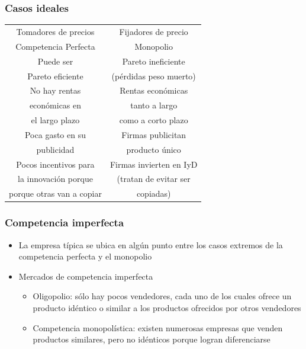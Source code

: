 \documentclass{beamer}
\begin{document}
\begin{frame}
\frametitle{Casos ideales}
\small
\begin{center}
    \begin{tabular}{c|c}
    \hline
    \hline
    Tomadores de precios & Fijadores de precio \\
    Competencia Perfecta & Monopolio
    \\
    \hline
    \hline
    Puede ser   & Pareto ineficiente \\ 
    Pareto eficiente & (pérdidas peso muerto)
    \\
    \hline
    No hay rentas & Rentas económicas \\
    económicas en & tanto a largo \\
    el largo plazo & como a corto plazo
    \\
    \hline
    Poca gasto en su & Firmas publicitan \\ publicidad & producto único 
    \\
    \hline
    Pocos incentivos para & Firmas invierten en IyD \\ 
    la innovación porque & (tratan de evitar ser \\
    porque otras van a copiar & copiadas)
\end{tabular}
\end{center}
\end{frame}

\begin{frame}
\frametitle{Competencia imperfecta}
\begin{itemize}
    \item La empresa típica se ubica en algún punto entre los casos extremos de la competencia perfecta y el monopolio \vspace{4mm}
    \item Mercados de competencia imperfecta \vspace{2mm}
    \begin{itemize}
        \item Oligopolio: sólo hay pocos vendedores, cada uno de los cuales ofrece un producto idéntico o similar a los productos ofrecidos por otros vendedores
        \item Competencia monopolística: existen numerosas empresas que venden productos similares, pero no idénticos porque logran diferenciarse
    \end{itemize}
    \end{itemize}
\end{frame}
\end{document}
